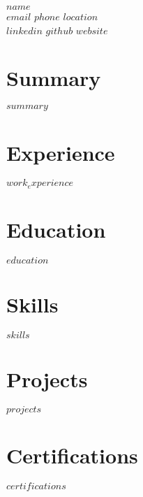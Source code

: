 \documentclass[11pt,a4paper]{article}
\begin{document}
\begin{center}
  {\LARGE\bfseries $name$}\\
  $email$ \quad $phone$ \quad $location$ \\
  $linkedin$ $github$ $website$
\end{center}

\vspace{6pt}
\section*{Summary}
$summary$

\section*{Experience}
$work_experience$

\section*{Education}
$education$

\section*{Skills}
$skills$

\section*{Projects}
$projects$

\section*{Certifications}
$certifications$
\end{document}
